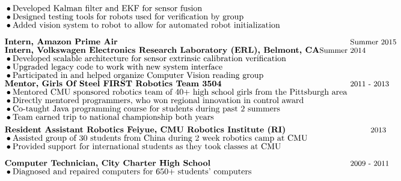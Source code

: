 \documentclass[]{article}
\newcommand{\subpoint}[1]{\bullet \text{\fontsize{10pt}{12pt}\selectfont #1}}
\newcommand{\Date}[1]{ \text{\fontsize{9pt}{12pt}\selectfont #1}}
\begin{document}
\begin{align*}
& && \subpoint{ Developed Kalman filter  and EKF for sensor fusion}\\[-.5em]
& && \subpoint{ Designed testing tools for robots used for verification by group} \\[-.5em]
& && \subpoint{ Added vision system to robot to allow for automated robot initialization }\\[.5em]
%
& && \textbf{Intern, Amazon Prime Air} && \hspace{-1.0cm} \Date{Summer 2015}\\[-.5em]
& && \textbf{Intern, Volkswagen Electronics Research Laboratory (ERL), Belmont, CA} \Date{Summer 2014}\\[-.5em]
& &&\subpoint{Developed scalable architecture for sensor extrinsic calibration verification}\\[-.5em]
& &&\subpoint{Upgraded legacy code to work with new system interface}\\[-.5em]
& &&\subpoint{Participated in and helped organize Computer Vision reading group}\\[-.5em]
& && \textbf{Mentor, Girls Of Steel FIRST Robotics Team 3504} && 
\hspace{-1.0cm} \Date{2011 - 2013}\\[-.5em]
%
& && \subpoint{ Mentored CMU sponsored robotics team of 40+ high school girls from the Pittsburgh area}\\[-.5em]
& && \subpoint{ Directly mentored programmers, who won regional innovation in control  award}\\[-.5em]
& && \subpoint{ Co-taught Java programming course for students during past 2 summers}\\[-.5em]
& && \subpoint{ Team earned trip to national  championship both years} \\
%
& && \textbf{Resident Assistant Robotics Feiyue, CMU Robotics Institute (RI) }&&
 \hspace{-.15cm} \Date{ 2013}\\[-.5em]
& && \subpoint{Assisted group of 30 students from China during 2 week robotics camp at CMU}\\[-.5em]
& && \subpoint{Provided support for international students as they took classes at CMU}\\[.5em]
%
%
& && \textbf{Computer Technician, City Charter High School} && 
\hspace{-1.0cm} \Date{2009 - 2011}\\[-.5em]
& && \subpoint{Diagnosed and repaired computers for 650+ students' computers}\\[-.5em]

\end{align*}
\end{document}
